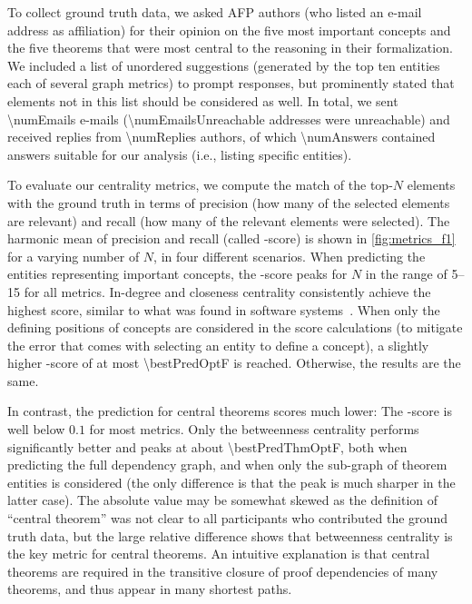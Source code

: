 To collect ground truth data, we asked AFP authors
(who listed an e-mail address as affiliation)
for their opinion on the five most important concepts
and the five theorems that were most central to the reasoning in their formalization.
We included a list of unordered suggestions
(generated by the top ten entities each of several graph metrics)
to prompt responses,
but prominently stated that elements not in this list should be considered as well.
In total, we sent \num{\numEmails} e-mails (\num{\numEmailsUnreachable} addresses were unreachable) and received replies from \num{\numReplies} authors,
of which \num{\numAnswers} contained answers suitable for our analysis
(i.e., listing specific entities).

To evaluate our centrality metrics,
we compute the match of the top-$N$ elements with the ground truth
in terms of precision
(how many of the selected elements are relevant)
and recall
(how many of the relevant elements were selected).
The harmonic mean of precision and recall (called \fOne-score) is shown in \autoref{fig:metrics_f1} for a varying number of $N$,
in four different scenarios.
When predicting the entities representing important concepts,
the \fOne-score peaks for $N$ in the range of \numrange{5}{15} for all metrics.
In-degree and closeness centrality consistently achieve the highest score,
similar to what was found in software systems~\cite{DefectsMetrics2008Zimmermann}.
When only the defining positions of concepts are considered in the score calculations
(to mitigate the error that comes with selecting an entity to define a concept),
a slightly higher \fOne-score of at most \num[round-mode=places,round-precision=2]{\bestPredOptF}
is reached.
Otherwise, the results are the same.

In contrast, the prediction for central theorems scores much lower:
The \fOne-score is well below $0.1$ for most metrics.
Only the betweenness centrality performs significantly better and peaks at about \num[round-mode=places,round-precision=2]{\bestPredThmOptF},
both when predicting the full dependency graph, and when only the sub-graph of theorem entities is considered
(the only difference is that the peak is much sharper in the latter case).
The absolute value may be somewhat skewed as the definition of \enquote{central theorem} was not clear to all participants who contributed the ground truth data,
but the large relative difference shows that betweenness centrality is the key metric for central theorems.
An intuitive explanation is that central theorems are required in the transitive closure of proof dependencies of many theorems,
and thus appear in many shortest paths.


